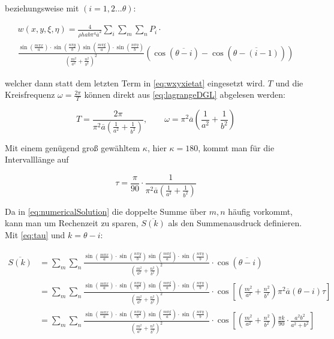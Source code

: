 beziehungsweise mit $(i=1,2 ... \theta)$: 

\begin{multline}
 	w(x,y,\xi, \eta) = \frac{4}{\rho h a b \pi^4 \overline{a}^2} \sum_i \sum_m \sum_n P_{i} \cdot \\ \frac{\sin\left(\frac{m \pi x}{a}\right) \cdot \sin\left(\frac{n \pi y}{b}\right) \sin\left(\frac{m \pi \xi}{a}\right) \cdot \sin\left(\frac{n \pi \eta}{b}\right)	}{ \left( \frac{m^2}{a^2} + \frac{n^2}{b^2} \right)^2} \left( \cos(\overline{\theta - i}) - \cos(\overline{\theta - (i-1)}) \right) 	
\label{eq:numericalSolution}
\end{multline}

welcher dann statt dem letzten Term in \ref{eq:wxyxietat} eingesetzt wird. $T$ und die Kreisfrequenz $\omega = \frac{2 \pi}{T}$ können direkt aus \ref{eq:lagrangeDGL} abgelesen werden: 

\begin{equation}
	T = \frac{2 \pi}{\pi^2 \overline{a} \left( \frac{1}{a^2} + \frac{1}{b^2} \right) }, \qquad \omega=\pi^2 \overline{a} \left( \frac{1}{a^2}+\frac{1}{b^2} \right)
\end{equation}

Mit einem genügend groß gewähltem $\kappa$, hier $\kappa=180$, kommt man für die Intervalllänge auf

\begin{equation}
	\tau = \frac{\pi}{90} \cdot \frac{1}{\pi^2 \overline{a} \left( \frac{1}{a^2} + \frac{1}{b^2} \right) }
	\label{eq:tau}
\end{equation}

\newpage

Da in \ref{eq:numericalSolution} die doppelte Summe über $m,n$ häufig vorkommt, kann man um Rechenzeit zu sparen, $\overline{S(k)}$ als den Summenausdruck definieren. Mit \ref{eq:tau} und $k=\theta - i$:

\begin{equation}
\begin{split}
\overline{S(k)} & = \sum_m \sum_n \frac{\sin\left(\frac{m \pi x}{a}\right) \cdot \sin\left(\frac{n \pi y}{b}\right) \sin\left(\frac{m \pi \xi}{a}\right) \cdot \sin\left(\frac{n \pi \eta}{b}\right)	}{ \left( \frac{m^2}{a^2} + \frac{n^2}{b^2} \right)^2} \cdot \cos\left(\overline{\theta - i}\right) \\ 
& = \sum_m \sum_n \frac{\sin\left(\frac{m \pi x}{a}\right) \cdot \sin\left(\frac{n \pi y}{b}\right) \sin\left(\frac{m \pi \xi}{a}\right) \cdot \sin\left(\frac{n \pi \eta}{b}\right)	}{ \left( \frac{m^2}{a^2} + \frac{n^2}{b^2} \right)^2} \cdot \cos \left[ \left( \frac{m^2}{a^2}+\frac{n^2}{b^2} \right) \pi^2\overline{a}(\theta - i)\tau\right] \\
&= \sum_m \sum_n \frac{\sin\left(\frac{m \pi x}{a}\right) \cdot \sin\left(\frac{n \pi y}{b}\right) \sin\left(\frac{m \pi \xi}{a}\right) \cdot \sin\left(\frac{n \pi \eta}{b}\right)	}{ \left( \frac{m^2}{a^2} + \frac{n^2}{b^2} \right)^2} \cdot \cos \left[ \left( \frac{m^2}{a^2}+\frac{n^2}{b^2} \right) \frac{\pi k}{90} \cdot \frac{a^{2}b^{2}}{a^{2}+b^{2}} \right] \\
\end{split}
\end{equation}


